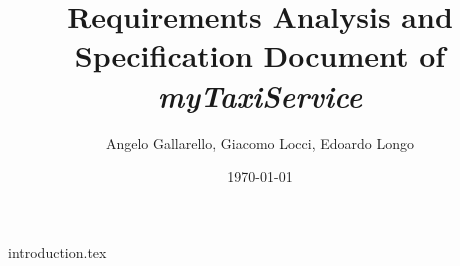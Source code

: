 \documentclass[12pt, a4paper]{article}
\begin{document}
\title{Requirements Analysis and Specification Document of \emph{myTaxiService}}

\author{Angelo Gallarello, Giacomo Locci, Edoardo Longo}
\date{\today}
\maketitle
\tableofcontents


{introduction.tex}



\end{document}
